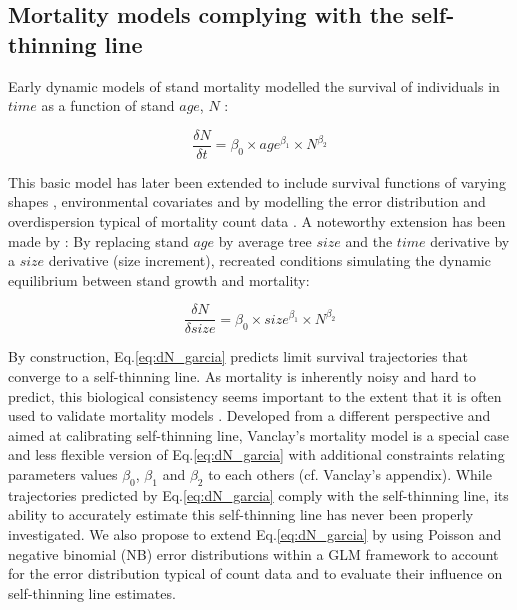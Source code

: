 \documentclass[12pt,english]{article}
\begin{document}
\subsection{Mortality models complying with the self-thinning line} 
Early dynamic models of stand mortality modelled the survival of individuals in $time$ as a function of stand $age$, $N$ \citep{ClutterJonesUnitedEtAl1980}:	
	
	\begin{equation}
	  \label{eq:dN_clutter}
	  \frac{\delta N}{\delta t} = \beta_0 \times age^{\beta_1} \times N^{\beta_2}
	\end{equation}	
	
This basic model has later been extended to include survival functions of varying shapes \citep*{RoseJrClutterShiverEtAl2004}, environmental covariates \citep{ThapaBurkhart2015} and by modelling the error distribution and overdispersion typical of mortality count data \citep{Affleck2006}. A noteworthy extension has been made by \citet{Garcia2009}: By replacing stand $age$ by average tree $size$ and the $time$ derivative by a $size$ derivative (size increment), \citet{Garcia2009} recreated conditions simulating the dynamic equilibrium between stand growth and mortality:
	
	\begin{equation}
  	  \label{eq:dN_garcia}
	  \frac{\delta N}{\delta size} = \beta_0 \times size^{\beta_1} \times N^{\beta_2}
	\end{equation}	

By construction, Eq.\ref{eq:dN_garcia} predicts limit survival trajectories that converge to a self-thinning line. 
As mortality is inherently noisy and hard to predict, this biological consistency seems important to the extent that it is often used to validate mortality models \citep{MonserudLedermannSterba2004,FortinTremblaySchneider2014,VospernikMonserudSterba2015}. Developed from a different perspective and aimed at calibrating self-thinning line, Vanclay's mortality model \citep{VanclaySands2009} is a special case and less flexible version of Eq.\ref{eq:dN_garcia} with additional constraints relating parameters values $\beta_0$, $\beta_1$ and $\beta_2$ to each others (cf. Vanclay's appendix). While trajectories predicted by Eq.\ref{eq:dN_garcia} comply with the self-thinning line, its ability to accurately estimate this self-thinning line has never been properly investigated. We also propose to extend Eq.\ref{eq:dN_garcia} by using Poisson and negative binomial (NB) error distributions within a GLM framework to account for the error distribution typical of count data \citep{Affleck2006} and to evaluate their influence on self-thinning line estimates. %
	
\end{document}
